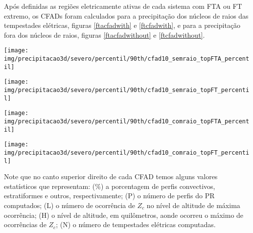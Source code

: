 
Após definidas as regiões eletricamente ativas de cada sistema com FTA ou FT extremo, os CFADs foram calculados para a precipitação dos núcleos de raios das tempestades elétricas, figuras \ref{ftacfadwith} e \ref{ftcfadwith}, e para a precipitação fora dos núcleos de raios, figuras \ref{ftacfadwithout} e \ref{ftcfadwithout}.

\begin{sidewaysfigure}
\centering
\texttt{[image: img/precipitacao3d/severo/percentil/90th/cfad10\_semraio\_topFTA\_percentil]}
\caption{CFADs para os extremos de FTA. Porção da precipitação sem raios.}
\label{ftacfadwithout}
\end{sidewaysfigure} 
\begin{sidewaysfigure}
\centering
\texttt{[image: img/precipitacao3d/severo/percentil/90th/cfad10\_semraio\_topFT\_percentil]}
\caption{CFADs para os extremos de FT. Porção da precipitação sem raios.}
\label{ftcfadwithout}
\end{sidewaysfigure} 
\begin{sidewaysfigure}
  \centering
  \texttt{[image: img/precipitacao3d/severo/percentil/90th/cfad10\_comraio\_topFTA\_percentil]}
  \caption{CFADs para os extremos de FTA. Porção da precipitação com raios.}
  \label{ftacfadwith}   
\end{sidewaysfigure} 
\begin{sidewaysfigure}
  \centering
  \texttt{[image: img/precipitacao3d/severo/percentil/90th/cfad10\_comraio\_topFT\_percentil]}
  \caption{CFADs para os extremos de FT. Porção da precipitação com raios.}
  \label{ftcfadwith}   
\end{sidewaysfigure} 

Note que no canto superior direito de cada CFAD temos alguns valores estatísticos que representam: (\%)  a porcentagem de perfis convectivos, estratiformes e outros, respectivamente; (P) o número de perfis do PR computados; (L) o número de ocorrência de $Z_c$ no nível de altitude de máxima ocorrência; (H) o nível de altitude, em quilômetros, aonde ocorreu o máximo de ocorrências de $Z_c$; (N) o número de tempestades elétricas computadas.


